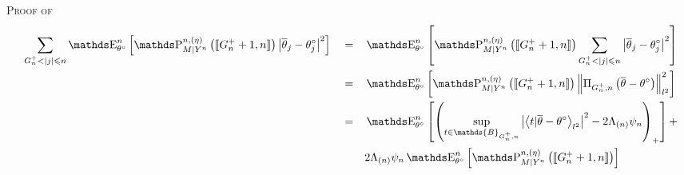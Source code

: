 \begin{pro}{\textsc{Proof of } \\}
\begin{alignat}{3}
& \sum\limits_{G^{+}_{n} < \vert j \vert \leq n} \E_{\theta^{\circ}}^{n}\left[\P_{M \vert Y^{n}}^{n, (\eta)}\left(\llbracket G^{+}_{n} + 1, n\rrbracket\right) \left\vert \overline{\theta}_{j} - \theta^{\circ}_{j}\right\vert^{2} \right] && = &&  \E_{\theta^{\circ}}^{n}\left[\P_{M \vert Y^{n}}^{n, (\eta)}\left(\llbracket G^{+}_{n} + 1, n\rrbracket\right) \sum\limits_{G^{+}_{n} < \vert j \vert \leq n} \left\vert \overline{\theta}_{j} - \theta^{\circ}_{j}\right\vert^{2} \right] \notag\\
& && = && \E_{\theta^{\circ}}^{n}\left[\P_{M \vert Y^{n}}^{n, (\eta)}\left(\llbracket G^{+}_{n} + 1, n\rrbracket\right) \left\Vert \Pi_{G^{+}_{n}, n}\left(\overline{\theta} - \theta^{\circ}\right)\right\Vert_{l^{2}}^{2} \right] \notag\\
& && = && \E_{\theta^{\circ}}^{n}\left[ \left(\sup\limits_{t \in \mathds{B}_{G^{+}_{n}, n}} \left\vert\left\langle t \vert \overline{\theta} - \theta^{\circ}\right\rangle_{l^{2}} \right\vert^{2} - 2 \Lambda_{(n)} \psi_{n} \right)_{+} \right]+ \label{EQD.34}\\
& && && 2 \Lambda_{(n)} \psi_{n} \E_{\theta^{\circ}}^{n}\left[ \P_{M \vert Y^{n}}^{n, (\eta)}\left(\llbracket G^{+}_{n} + 1, n \rrbracket\right)\right]\label{EQD.35}
\end{alignat}
\end{pro}

